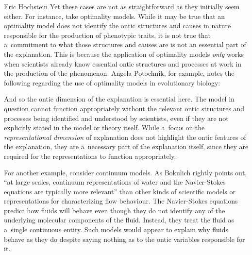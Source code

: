 \begin{artengenv}{Eric Hochstein}
Yet these cases are not as straightforward as they initially seem either. For instance, take optimality models. While it may be true that an optimality model does not identify the ontic structures and causes in nature responsible for the production of phenotypic traits, it is not true that a~commitment to what those structures and causes are is not an essential part of the explanation. This is because the application of optimality models \textit{only} works when scientists already know essential ontic structures and processes at work in the production of the phenomenon. Angela Potochnik, for example, notes the following regarding the use of optimality models in evolutionary biology:


And so the ontic dimension of the explanation is essential here. The model in question cannot function appropriately without the relevant ontic structures and processes being identified and understood by scientists, even if they are not explicitly stated in the model or theory itself. While a~focus on the \textit{representational dimension} of explanation does not highlight the ontic features of the explanation, they are a~necessary part of the explanation itself, since they are required for the representations to function appropriately.

For another example, consider continuum models. As Bokulich
\parencite*[][p.803]{bokulich_representing_2018} %
 rightly points out, ``at large scales, continuum representations of water and the Navier-Stokes equations are typically more relevant'' than other kinds of scientific models or representations for characterizing flow behaviour. The Navier-Stokes equations predict how fluids will behave even though they do not identify any of the underlying molecular components of the fluid. Instead, they treat the fluid as a~single continuous entity. Such models would appear to explain why fluids behave as they do despite saying nothing as to the ontic variables responsible for it.


\end{artengenv}
